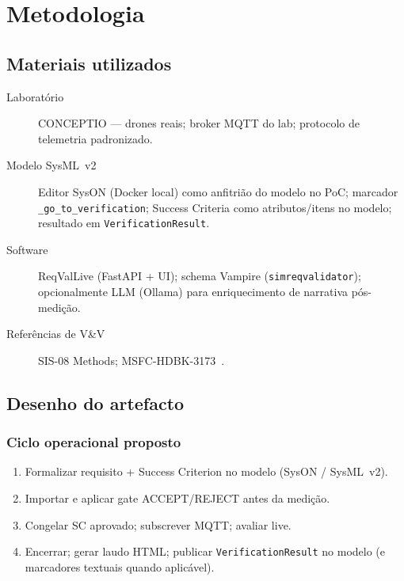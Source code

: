 \chapter{Metodologia}
\label{cap:metodologia}


\section{Materiais utilizados}
\label{sec:materiais}

\begin{description}
  \item[Laboratório] CONCEPTIO --- drones reais; broker MQTT do lab; protocolo
        de telemetria padronizado.
  \item[Modelo SysML~v2] Editor SysON (Docker local) como anfitrião do modelo no
        PoC; marcador \texttt{\_go\_to\_verification}; Success Criteria como
        atributos/itens no modelo; resultado em \texttt{VerificationResult}.
  \item[Software] ReqValLive (FastAPI + UI); schema Vampire
        (\texttt{simreqvalidator}); opcionalmente LLM (Ollama) para enriquecimento
        de narrativa pós-medição.
  \item[Referências de V\&V] SIS-08 Methods; MSFC-HDBK-3173~\cite{msfc3173}.
\end{description}


\section{Desenho do artefacto}
\label{sec:desenho-artefacto}


\subsection{Ciclo operacional proposto}

\begin{enumerate}
  \item Formalizar requisito + Success Criterion no modelo (SysON / SysML~v2).
  \item Importar e aplicar gate ACCEPT/REJECT antes da medição.
  \item Congelar SC aprovado; subscrever MQTT; avaliar live.
  \item Encerrar; gerar laudo HTML; publicar \texttt{VerificationResult} no modelo
        (e marcadores textuais quando aplicável).
\end{enumerate}

